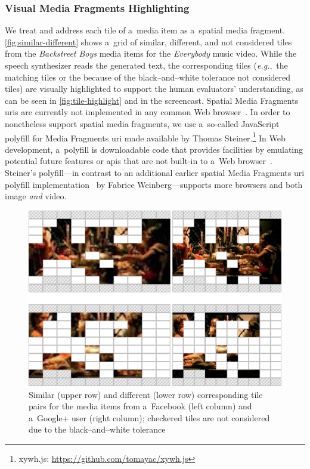 \documentclass{article}
\begin{document}
\subsubsection{Visual Media Fragments Highlighting}
We treat and address each tile of a~media item as a~spatial media fragment. \autoref{fig:similar-different} shows a~grid of similar, different, and not considered tiles from the \emph{Backstreet Boys} media items for the \emph{Everybody} music video. While the speech synthesizer reads the generated text, the corresponding tiles (\emph{e.g.},~the matching tiles or the because of the black--and--white tolerance not considered tiles) are visually highlighted to support the human evaluators' understanding, as can be seen in \autoref{fig:tile-highlight} and in the screencast. Spatial Media Fragments {\sc uri}s are currently not implemented in any common Web browser~\cite{weinberg2013polyfill}. In order to nonetheless support spatial media fragments, we use a~so-called JavaScript polyfill for Media Fragments {\sc uri} made available by Thomas Steiner.\footnote{xywh.js: \url{https://github.com/tomayac/xywh.js}} In Web development, a~polyfill is downloadable code that provides facilities by emulating potential future features or {\sc api}s that are not built-in to a~Web browser~\cite{sharp2010polyfill}. Steiner's polyfill---in contrast to an additional earlier spatial Media Fragments {\sc uri} polyfill implementation~\cite{weinberg2013polyfill} by Fabrice Weinberg---supports more browsers and both image \emph{and} video.

\begin{figure}[t!]
  \centering
  \includegraphics[width=0.75\linewidth]{./similar-different.png}
  \caption{Similar (upper row) and different (lower row) corresponding tile pairs for the media items from a~Facebook (left column) and a~Google+ user (right column); checkered tiles are not considered due to the black--and--white tolerance}
  \label{fig:similar-different}
\end{figure}
\end{document}
